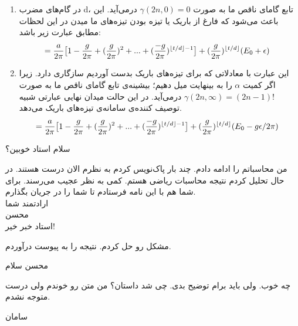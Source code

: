 \begin{enumerate}
	\item 
	در گام‌های مضرب d، تابع گامای ناقص ما به صورت 
	$ \gamma(2n,0) = 0 $
	درمی‌آید. این باعث می‌شود که فارغ از باریک یا تیزه بودن تیزه‌های ما میدن در این لحظات مطابق 		عبارت زیر باشد:
	\begin{align}
		&= \frac{a}{2\pi} \big[ 1 - \frac{g}{2\pi} + (\frac{g}{2\pi})^2 + ... + (\frac{-g}{2\pi})^{\left\lfloor t/d \right\rfloor - 1} \big] + (\frac{g}{2\pi})^{\left\lfloor t/d \right\rfloor} (E_0 + \epsilon)
	\end{align}
	
	\item 
	این عبارت با معادلاتی که برای تیزه‌های باریک بدست آوردیم سازگاری دارد. زیرا اگر کمیت
	$\alpha$
	را به بینهایت میل دهیم؛ بیشینه‌ی تابع گامای ناقص ما به صورت 
	$ \gamma(2n,\infty) = (2n-1)! $
	درمی‌آید. در این حالت میدان نهایی عبارتی شبیه توصیف ‌کننده‌ی سامانه‌ی تیزه‌های باریک می‌دهد.
	\begin{align}
		&= \frac{a}{2\pi} \big[ 1 - \frac{g}{2\pi} + (\frac{g}{2\pi})^2 + ... + (\frac{-g}{2\pi})^{\left\lfloor t/d \right\rfloor - 1} \big] + (\frac{g}{2\pi})^{\left\lfloor t/d \right\rfloor} (E_0 - g\epsilon/2\pi)
	\end{align}
	
\end{enumerate}

\begin{mohsenletter}
	سلام استاد خوبین؟
	
	من محاسباتم را ادامه دادم. چند بار پاک‌نویس کردم به نظرم الان درست هستند. در حال تحلیل کردم نتیجه محاسبات ریاضی هستم. کمی به نظر عجیب می‌رسند. برای شما هم با این نامه فرستادم تا شما را در جریان بگذارم.\\
	
	ارادتمند شما\\
	محسن\\
	\medskip
	استاد خبر خیر!
	
	مشکل رو حل کردم. نتیجه را به پیوست درآوردم.
	
	محسن
	سلام
	
	چه خوب. ولی باید برام توضیح بدی. چی شد داستان؟ من متن رو خوندم ولی درست متوجه نشدم.
	
	سامان

\end{mohsenletter}

